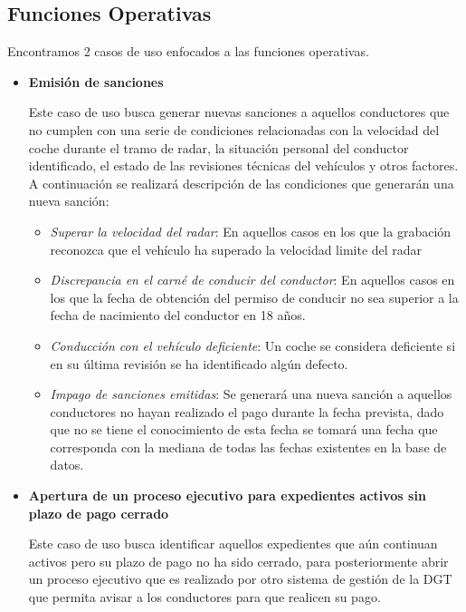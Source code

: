 \documentclass[]{article}
\begin{document}
\subsection{Funciones Operativas}
\label{subsec:funciones_operativas}

Encontramos 2 casos de uso enfocados a las funciones operativas.
\begin{itemize}
    \item \textbf{Emisión de sanciones}
    
    Este caso de uso busca generar nuevas sanciones a aquellos conductores que no cumplen con una serie de condiciones relacionadas con la velocidad del coche durante el tramo de radar, la situación personal del conductor identificado, el estado de las revisiones técnicas del vehículos y otros factores.
    A continuación se realizará descripción de las condiciones que generarán una nueva sanción:
    \begin{itemize}
        \item \textit{Superar la velocidad del radar}: En aquellos casos en los que la grabación reconozca que el vehículo ha superado la velocidad limite del radar
        \item \textit{Discrepancia en el carné de conducir del conductor}: En aquellos casos en los que la fecha de obtención del permiso de conducir no sea superior a la fecha de nacimiento del conductor en 18 años.
        \item \textit{Conducción con el vehículo deficiente}: Un coche se considera deficiente si en su última revisión se ha identificado algún defecto. 
        \item \textit{Impago de sanciones emitidas}: Se generará una nueva sanción a aquellos conductores no hayan realizado el pago durante la fecha prevista, dado que no se tiene el conocimiento de esta fecha se tomará una fecha que corresponda con la mediana de todas las fechas existentes en la base de datos.
    \end{itemize}
    \item \textbf{Apertura de un proceso ejecutivo para expedientes activos sin plazo de pago cerrado}
    
    Este caso de uso busca identificar aquellos expedientes que aún continuan activos pero su plazo de pago no ha sido cerrado, para posteriormente abrir un proceso ejecutivo que es realizado por otro sistema de gestión de la DGT que permita avisar a los conductores para que realicen su pago.
\end{itemize}
\end{document}
